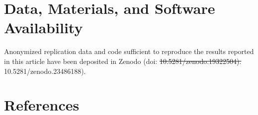 \documentclass[9pt,twocolumn,twoside]{pnas-new}
\providecommand{\DIFadd}[1]{{\protect\color{red}#1}}
\providecommand{\DIFdel}[1]{{\protect\color{red}\protect\sout{#1}}}
\begin{document}
\showacknow{}
\vspace{0.5cm}
\section*{Data, Materials, and Software Availability}
Anonymized replication data and code sufficient to reproduce the results reported in this article have been deposited in Zenodo \citep{sun_sorin_suryadarma_rahut_resosudarmo_2026} (doi: \DIFdel{10.5281/zenodo.19322504).} \DIFadd{10.5281/zenodo.23486188).}

\vspace{1cm}
\section*{References}


\end{document}
